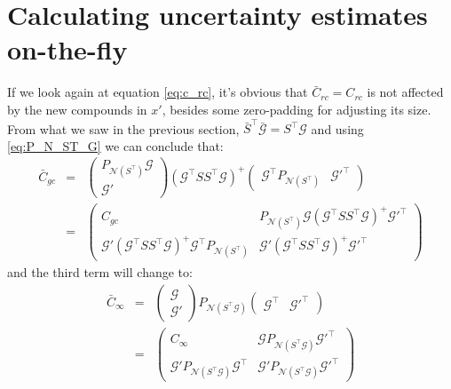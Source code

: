 \documentclass[11pt]{article}
\newcommand{\Gmat}{\mathcal{G}}
\newcommand{\PNmat}[1]{P_{\mathcal{N}\left(#1\right)}}
\begin{document}
\section{Calculating uncertainty estimates on-the-fly}
If we look again at equation \ref{eq:c_rc}, it's obvious that $\bar{C}_{rc} = C_{rc}$ is not affected by the new compounds in $x'$, besides some zero-padding for adjusting its size. From what we saw in the previous section, $\bar{S}^\top \bar{\Gmat} = S^\top \Gmat$ and using \ref{eq:P_N_ST_G} we can conclude that:
\begin{eqnarray}
	\bar{C}_{gc} &=& \left( \begin{array}{c} \PNmat{S^\top} \Gmat \\ \hline \Gmat' \end{array} \right)
	\left(\Gmat^{\top}SS^{\top}\Gmat\right)^{+} 
	\left( \begin{array}{c|c} \Gmat^\top \PNmat{S^\top} & \Gmat'^\top \end{array} \right) 
\\
&=&
\left( \begin{array}{c|c} C_{gc} & \PNmat{S^\top} \Gmat \left(\Gmat^{\top}SS^{\top}\Gmat\right)^{+} \Gmat'^\top \\ \hline \Gmat' \left(\Gmat^{\top}SS^{\top}\Gmat\right)^{+} \Gmat^\top \PNmat{S^\top} & \Gmat'\left(\Gmat^{\top}SS^{\top}\Gmat\right)^{+} \Gmat'^\top \end{array} \right)
\end{eqnarray}
and the third term will change to:
\begin{eqnarray}
	\bar{C}_{\infty} &=& 
		\left(\begin{array}{c} \Gmat \\ \hline \Gmat' \end{array}\right)
		\PNmat{S^\top\Gmat}
		\left(\begin{array}{c|c} \Gmat^\top & \Gmat'^\top \end{array}\right)
\\ &=&
	\left(\begin{array}{c|c}
		C_\infty &
		\Gmat \PNmat{S^\top\Gmat} \Gmat'^\top \\ \hline
		\Gmat' \PNmat{S^\top\Gmat} \Gmat^\top &
		\Gmat' \PNmat{S^\top\Gmat} \Gmat'^\top
 \end{array}\right)
\end{eqnarray}
\end{document}
